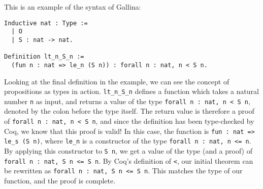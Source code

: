 This is an example of the syntax of Gallina:

\begin{minipage}{\linewidth}
\begin{lstlisting}[language=Coq, label={lst:gallina_ex}, caption={Example of Gallina syntax}]
Inductive nat : Type :=
  | O
  | S : nat -> nat.

Definition lt_n_S_n :=
  (fun n : nat => le_n (S n)) : forall n : nat, n < S n.
\end{lstlisting}
\end{minipage}

Looking at the final definition in the example, we can see the
concept of propositions as types in action.
\lstinline{lt_n_S_n} defines a function which takes a natural number \lstinline{n}
as input, and returns a value of the type \lstinline{forall n : nat, n < S n},
denoted by the colon before the type itself.
The return value is therefore a proof of \lstinline{forall n : nat, n < S n}, and since
the definition has been type-checked by Coq, we know that this proof is valid!
In this case, the function is
\lstinline{fun : nat => le_s (S n)}, where \lstinline{le_n} is a constructor
of the type \lstinline{forall n : nat, n <= n}. By applying this constructor
to \lstinline{S n}, we get a value of the type (and a proof) of
\lstinline{forall n : nat, S n <= S n}. By Coq's definition of \lstinline{<},
our initial theorem can be rewritten as \lstinline{forall n : nat, S n <= S n}.
This matches the type of our function, and the proof is complete.

